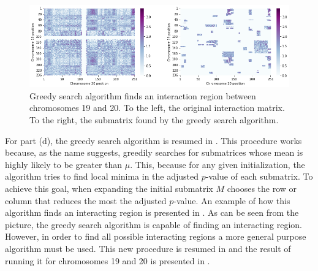 \documentclass[11pt, english, twocolumn]{article}
\begin{document}
\begin{figure}[b]
	\centering
	\includegraphics[width=.8\textwidth]{overall-greedy-search}
	\caption{Greedy search algorithm finds an interaction region between chromosomes 19 and 20. To the left, the original interaction matrix. To the right, the submatrix found by the greedy search algorithm.}
	\label{fig:overall-greedy-search}
\end{figure}

For part (d), the greedy search algorithm is resumed in . This procedure works because, as the name suggests, greedily searches for submatrices whose mean is highly likely to be greater than $\mu$. This, because for any given initialization, the algorithm tries to find local minima in the adjusted $p$-value of each submatrix. To achieve this goal, when expanding the initial submatrix $M$ chooses the row or column that reduces the most the adjusted $p$-value. An example of how this algorithm finds an interacting region is presented in . As can be seen from the picture, the greedy search algorithm is capable of finding an interacting region. However, in order to find all possible interacting regions a more general purpose algorithm must be used. This new procedure is resumed in  and the result of running it for chromosomes 19 and 20 is presented in . 
\end{document}
